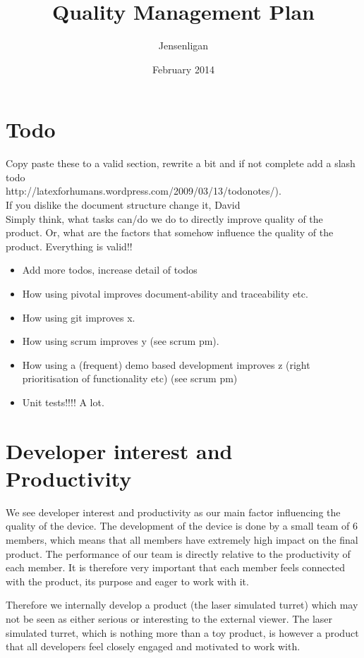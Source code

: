 \documentclass{article}
\title{Quality Management Plan}
\author{Jensenligan}
\date{February 2014}
\begin{document}
\maketitle

\section{Todo}


Copy paste these to a valid section, rewrite a bit and if not complete add a slash todo \\
http://latexforhumans.wordpress.com/2009/03/13/todonotes/).\\If you dislike the document structure change it, David
\\
Simply think, what tasks can/do we do to directly improve quality of the product.
Or, what are the factors that somehow influence the quality of the product.
Everything is valid!!
\begin{itemize}
\item Add more todos, increase detail of todos
\item How using pivotal improves document-ability and traceability etc.
\item How using git improves x.
\item How using scrum improves y (see scrum pm).
\item How using a (frequent) demo based development improves z (right prioritisation of functionality etc) (see scrum pm)
\item Unit tests!!!! A lot.
\end{itemize}


\section{Developer interest and Productivity}
We see developer interest and productivity as our main factor influencing the quality of the device. 
The development of the device is done by a small team of 6 members, which means that all members have extremely high impact on the final product.
The performance of our team is directly relative to the productivity of each member.
It is therefore very important that each member feels connected with the product, its purpose and eager to work with it. 

Therefore we internally develop a product (the laser simulated turret) which may not be seen as either serious or interesting to the external viewer.
The laser simulated turret, which is nothing more than a toy product, is however a product that all developers feel closely engaged and motivated to work with.
\end{document}
